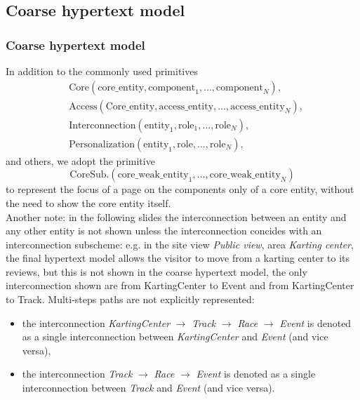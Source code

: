\documentclass{beamer}
\begin{document}
\subsection{Coarse hypertext model}

\begin{frame}
    \frametitle{Coarse hypertext model}
    \tiny
    In addition to the commonly used primitives
    \begin{align*}
        &\text{Core}(\text{core\_entity},\text{component}_1,\dots,\text{component}_N), \\
        &\text{Access}(\text{Core\_entity},\text{access\_entity},\dots,\text{access\_entity}_N), \\
        &\text{Interconnection}(\text{entity}_1, \text{role}_1, \dots, \text{role}_N), \\
        &\text{Personalization}(\text{entity}_1, \text{role}, \dots, \text{role}_N),
    \end{align*}
        and others, we adopt the primitive 
    $$ \text{CoreSub.}(\text{core\_weak\_entity}_1,\dots,\text{core\_weak\_entity}_N) $$
    to represent the focus of a page on the components only of a core entity, without the need to show the core entity itself. \\
    Another note: in the following slides the interconnection between an entity and any other entity is not shown unless the interconnection
    concides with an interconnection subscheme: e.g. in the site view \textit{Public view}, area \textit{Karting center}, the final hypertext model 
    allows the visitor to move from a karting center to its reviews, but this is not shown in the coarse hypertext model, the
    only interconnection shown are from KartingCenter to Event and from KartingCenter to Track.
    Multi-steps paths are not explicitly represented:
    \begin{itemize}
    \item the interconnection \textit{KartingCenter} $\rightarrow$ \textit{Track} $\rightarrow$ \textit{Race} $\rightarrow$ \textit{Event}
    is denoted as a single interconnection between \textit{KartingCenter} and \textit{Event} (and vice versa),
    \item the interconnection \textit{Track} $\rightarrow $ \textit{Race} $\rightarrow$ \textit{Event} is denoted as 
    a single interconnection between \textit{Track} and \textit{Event} (and vice versa).
    \end{itemize}
\end{frame}
\end{document}

